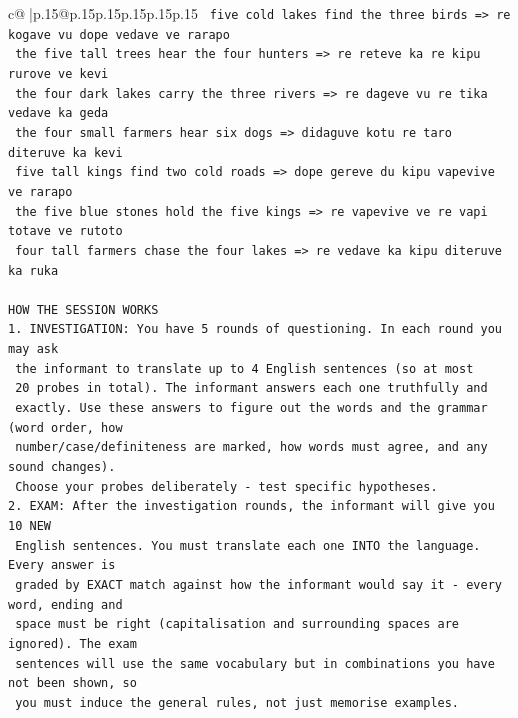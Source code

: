 \documentclass{article}
\begin{document}
{\begin{supertabular}{c@{$\;$}|p{.15\linewidth}@{}p{.15\linewidth}p{.15\linewidth}p{.15\linewidth}p{.15\linewidth}p{.15\linewidth}}
{{{\texttt{    five cold lakes find the three birds  =>  re kogave vu dope vedave ve rarapo} \\
\texttt{    the five tall trees hear the four hunters  =>  re reteve ka re kipu rurove ve kevi} \\
\texttt{    the four dark lakes carry the three rivers  =>  re dageve vu re tika vedave ka geda} \\
\texttt{    the four small farmers hear six dogs  =>  didaguve kotu re taro diteruve ka kevi} \\
\texttt{    five tall kings find two cold roads  =>  dope gereve du kipu vapevive ve rarapo} \\
\texttt{    the five blue stones hold the five kings  =>  re vapevive ve re vapi totave ve rutoto} \\
\texttt{    four tall farmers chase the four lakes  =>  re vedave ka kipu diteruve ka ruka} \\
\\ 
\texttt{HOW THE SESSION WORKS} \\
\texttt{1. INVESTIGATION: You have 5 rounds of questioning. In each round you may ask} \\
\texttt{   the informant to translate up to 4 English sentences (so at most} \\
\texttt{   20 probes in total). The informant answers each one truthfully and} \\
\texttt{   exactly. Use these answers to figure out the words and the grammar (word order, how} \\
\texttt{   number/case/definiteness are marked, how words must agree, and any sound changes).} \\
\texttt{   Choose your probes deliberately {-} test specific hypotheses.} \\
\texttt{2. EXAM: After the investigation rounds, the informant will give you 10 NEW} \\
\texttt{   English sentences. You must translate each one INTO the language. Every answer is} \\
\texttt{   graded by EXACT match against how the informant would say it {-} every word, ending and} \\
\texttt{   space must be right (capitalisation and surrounding spaces are ignored). The exam} \\
\texttt{   sentences will use the same vocabulary but in combinations you have not been shown, so} \\
\texttt{   you must induce the general rules, not just memorise examples.} \\
}}}
\end{supertabular}}
\end{document}
